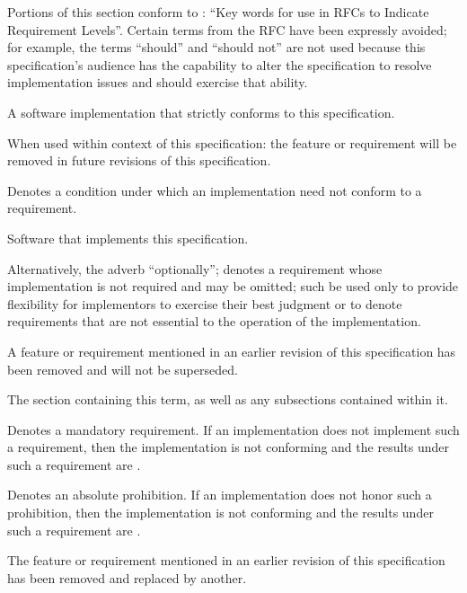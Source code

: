 %

\label{s:specdfn}

Portions of this section conform to : ``Key words for use in RFCs to
Indicate Requirement Levels''. Certain terms from the RFC have been expressly
avoided; for example, the terms ``should'' and ``should not'' are not used
because this specification's audience has the capability to alter the
specification to resolve implementation issues and should exercise that ability.

\begin{description}
  A software implementation that strictly conforms to this specification.

  When used within context of this specification: the feature or requirement
  will be removed in future revisions of this specification.

  Denotes a condition under which an implementation need not conform to a
  requirement.

  Software that implements this specification.

  Alternatively, the adverb ``optionally''; denotes a requirement whose
  implementation is not required and may be omitted; such \shall be used only to
  provide flexibility for implementors to exercise their best judgment or to
  denote requirements that are not essential to the operation of the
  implementation.

  A feature or requirement mentioned in an earlier revision of this
  specification has been removed and will not be superseded.

  The section containing this term, as well as any subsections contained within
  it.

  Denotes a mandatory requirement. If an implementation does not implement such
  a requirement, then the implementation is not conforming and the results under
  such a requirement are \undefined.

  Denotes an absolute prohibition. If an implementation does not honor such a
  prohibition, then the implementation is not conforming and the results under
  such a requirement are \undefined.

  The feature or requirement mentioned in an earlier revision of this
  specification has been removed and replaced by another.


\end{description}
